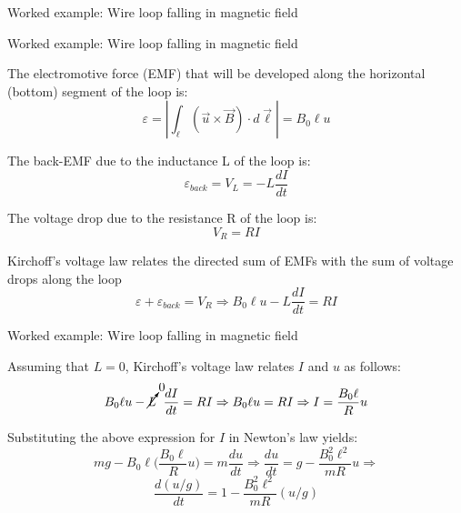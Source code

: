 {\begin{frame}{Worked example: Wire loop falling in magnetic field}
\end{frame}

%
%
%

\begin{frame}{Worked example: Wire loop falling in magnetic field}


  The electromotive force (EMF) that will be developed along the
  horizontal (bottom) segment of the loop is:
  \begin{equation*}
    \varepsilon =
      |\int_{\ell} (\vec{u} \times \vec{B}) \cdot d\vec{\ell}| = B_0 \ell u
  \end{equation*}

  The back-EMF due to the inductance L of the loop is:
  \begin{equation*}
    \varepsilon_{back} = V_{L} = - L \frac{dI}{dt}
  \end{equation*}

  The voltage drop due to the resistance R of the loop is:
  \begin{equation*}
    V_{R} = RI
  \end{equation*}

  Kirchoff's voltage law relates the directed sum of EMFs
  with the sum of voltage drops along the loop
  \begin{equation*}
    \varepsilon + \varepsilon_{back} = V_{R} \Rightarrow
    B_0 \ell u - L \frac{dI}{dt} = RI
  \end{equation*}

\end{frame}

%
%
%

\begin{frame}{Worked example: Wire loop falling in magnetic field}

  Assuming that $L=0$, Kirchoff's voltage law
  relates $I$ and $u$ as follows:
  \begin{equation*}
    B_0 \ell u - \cancelto{0}{L} \;\; \frac{dI}{dt} = RI \Rightarrow
    B_0 \ell u = RI \Rightarrow I = \frac{B_0 \ell}{R} u
  \end{equation*}

  Substituting the above expression for $I$
  in Newton's law yields:
  \begin{equation*}
    mg - B_0 \ell \Big( \frac{B_0 \ell}{R} u \Big) = m \frac{du}{dt} \Rightarrow
    \frac{du}{dt} = g - \frac{B_0^2 \ell^2}{mR} u \Rightarrow
  \end{equation*}
  \begin{equation*}
    \frac{d(u/g)}{dt} = 1 - \frac{B_0^2 \ell^2}{mR} (u/g)
  \end{equation*}


\end{frame}}
